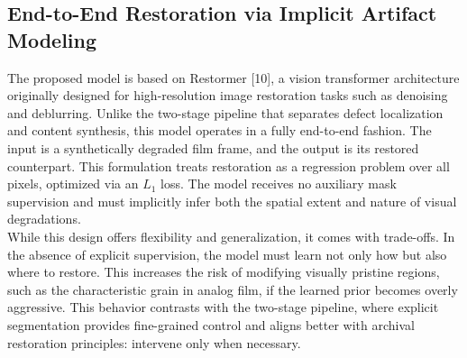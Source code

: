 \documentclass[10pt,a4paper,twocolumn,twoside]{article}
\begin{document}
\subsection{End-to-End Restoration via Implicit Artifact Modeling}
The proposed model is based on Restormer [10], a vision transformer architecture originally designed for high-resolution image restoration tasks such as denoising and deblurring. Unlike the two-stage pipeline that separates defect localization and content synthesis, this model operates in a fully end-to-end fashion. The input is a synthetically degraded film frame, and the output is its restored counterpart.
This formulation treats restoration as a regression problem over all pixels, optimized via an $L_1$ loss. The model receives no auxiliary mask supervision and must implicitly infer both the spatial extent and nature of visual degradations. \\
While this design offers flexibility and generalization, it comes with trade-offs. In the absence of explicit supervision, the model must learn not only how but also where to restore. This increases the risk of modifying visually pristine regions, such as the characteristic grain in analog film, if the learned prior becomes overly aggressive. This behavior contrasts with the two-stage pipeline, where explicit segmentation provides fine-grained control and aligns better with archival restoration principles: intervene only when necessary.
\end{document}

